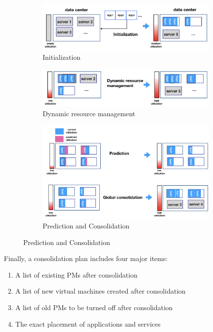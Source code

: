 \begin{figure}[H]
	\centering
	\begin{subfigure}[b]{0.9\textwidth}
		\includegraphics[width=\textwidth]{pics/initialization.png}
		\caption{Initialization}
	\end{subfigure}
	\begin{subfigure}[b]{0.9\textwidth}
		\includegraphics[width=\textwidth]{pics/dynamic_resource.png}
	\caption{Dynamic resource management}
	\end{subfigure}
	\begin{subfigure}[b]{0.9\textwidth}
		\includegraphics[width=\textwidth]{pics/predict_consolidate.png}
	\caption{Prediction and Consolidation}
	\end{subfigure}
	\label{fig:management}
\end{figure}

Finally, a consolidation plan includes four major items:
			\begin{enumerate}
				\item A list of existing PMs after consolidation
				\item A list of new virtual machines created after consolidation
				\item A list of old PMs to be turned off after consolidation
				\item The exact placement of applications and services
			\end{enumerate}

